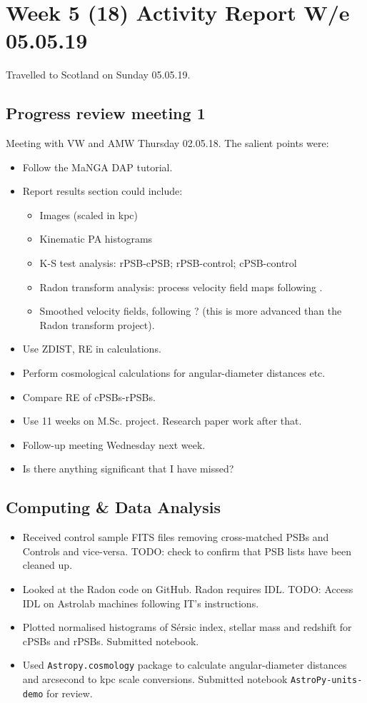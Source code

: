 \section{Week 5 (18) Activity Report W/e 05.05.19}
Travelled to Scotland on Sunday 05.05.19.
\subsection{Progress review meeting 1}
Meeting with VW and AMW Thursday 02.05.18. The salient points were:
\begin{itemize}
    \item Follow the MaNGA DAP tutorial.
    \item Report results section could include:
    \begin{itemize}
        \item Images (scaled in kpc)
        \item Kinematic PA histograms
        \item K-S test analysis: rPSB-cPSB; rPSB-control; cPSB-control
        \item Radon transform analysis: process velocity field maps following \citet{2018MNRAS.480.2217S}.
        \item Smoothed velocity fields, following \citet{2008ApJ...682..231S} ? (this is more advanced than the Radon transform project).
    \end{itemize}
    \item Use ZDIST, RE in calculations. 
    \item Perform cosmological calculations for angular-diameter distances etc.
    \item Compare RE of cPSBs-rPSBs.
    \item Use 11 weeks on M.Sc. project. Research paper work after that.
    \item Follow-up meeting Wednesday next week.
    \item Is there anything significant that I have missed?
\end{itemize}

\subsection{Computing \& Data Analysis}
\begin{itemize}
    \item Received control sample FITS files removing cross-matched PSBs and Controls and vice-versa. TODO: check to confirm that PSB lists have been cleaned up.    
    \item Looked at the Radon code on GitHub. Radon requires IDL. TODO: Access IDL on Astrolab machines following IT's instructions.
    \item {Plotted normalised histograms of S\'ersic index, stellar mass and redshift for cPSBs and rPSBs. Submitted notebook.}
    \item Used \texttt{Astropy.cosmology} package to calculate angular-diameter distances and arcsecond to kpc scale conversions. Submitted notebook \texttt{AstroPy-units-demo} for review.
\end{itemize}

